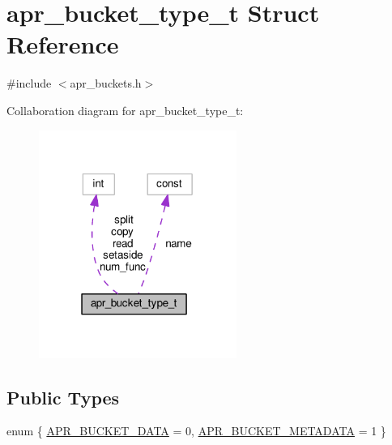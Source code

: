\hypertarget{structapr__bucket__type__t}{}\section{apr\+\_\+bucket\+\_\+type\+\_\+t Struct Reference}
\label{structapr__bucket__type__t}


{\ttfamily \#include $<$apr\+\_\+buckets.\+h$>$}



Collaboration diagram for apr\+\_\+bucket\+\_\+type\+\_\+t\+:
\nopagebreak
\begin{figure}[H]
\begin{center}
\leavevmode
\includegraphics[width=183pt]{structapr__bucket__type__t__coll__graph}
\end{center}
\end{figure}
\subsection*{Public Types}
\begin{DoxyCompactItemize}
\item 
enum \{ \hyperlink{structapr__bucket__type__t_a2c083ffe204e7b680e2de9edbf17a4b1a53d3ef9d6a275fe2b72a91acea7017d5}{A\+P\+R\+\_\+\+B\+U\+C\+K\+E\+T\+\_\+\+D\+A\+TA} = 0, 
\hyperlink{structapr__bucket__type__t_a2c083ffe204e7b680e2de9edbf17a4b1a9bf38b4eb3ea41c4af230432ac7a5fb1}{A\+P\+R\+\_\+\+B\+U\+C\+K\+E\+T\+\_\+\+M\+E\+T\+A\+D\+A\+TA} = 1
 \}
\end{DoxyCompactItemize}
